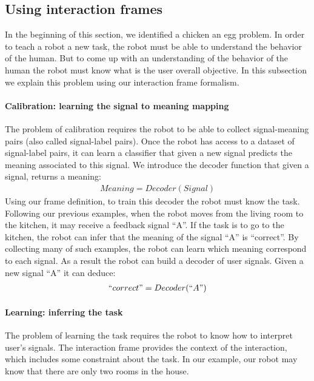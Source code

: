 \subsection{Using interaction frames}

In the beginning of this section, we identified a chicken an egg problem. In order to teach a robot a new task, the robot must be able to understand the behavior of the human. But to come up with an understanding of the behavior of the human the robot must know what is the user overall objective. In this subsection we explain this problem using our interaction frame formalism.

\paragraph{Calibration: learning the signal to meaning mapping}

The problem of calibration requires the robot to be able to collect signal-meaning pairs (also called signal-label pairs). Once the robot has access to a dataset of signal-label pairs, it can learn a classifier that given a new signal predicts the meaning associated to this signal. We introduce the decoder function that given a signal, returns a meaning:
%
\begin{eqnarray}
    Meaning = Decoder(Signal) \nonumber
\end{eqnarray}
%
Using our frame definition, to train this decoder the robot must know the task. Following our previous examples, when the robot moves from the living room to the kitchen, it may receive a feedback signal ``A''. If the task is to go to the kitchen, the robot can infer that the meaning of the signal ``A'' is ``correct''. By collecting many of such examples, the robot can learn which meaning correspond to each signal. As a result the robot can build a decoder of user signals. Given a new signal ``A'' it can deduce:
%
\begin{eqnarray}
    ``correct" = Decoder(``A") \nonumber
\end{eqnarray}

\paragraph{Learning: inferring the task}

The problem of learning the task requires the robot to know how to interpret user's signals. The interaction frame provides the context of the interaction, which includes some constraint about the task. In our example, our robot may know that there are only two rooms in the house. 

